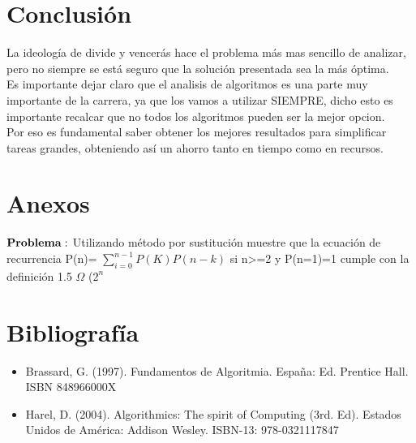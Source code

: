\documentclass[spanish]{article}
\begin{document}
	\section{Conclusi\'on}

	La ideología de divide y vencerás hace el problema más mas sencillo de analizar, pero no siempre se está seguro que la solución presentada sea la más óptima.\\
	Es importante dejar claro que el analisis de algoritmos es una parte muy importante de la carrera, ya que los vamos a utilizar SIEMPRE, dicho esto es importante recalcar que no todos los algoritmos pueden ser la mejor opcion.\\
	Por eso es fundamental saber obtener los mejores resultados para simplificar tareas grandes, obteniendo así un ahorro tanto en tiempo como en recursos.
		
\section{Anexos}
${\bf Problema :}$ Utilizando método por sustitución muestre que la ecuación de recurrencia P(n)= $\sum_{i=0}^{n-1}P(K)P(n-k)$ si n>=2 y P(n=1)=1 cumple con la definición 1.5 $\Omega$ ($2^{n}$ 

	\section{Bibliografía}
	\begin{itemize}
		\item Brassard, G. (1997). Fundamentos de Algoritmia. España: Ed. Prentice Hall. ISBN 		848966000X
		\item Harel, D. (2004). Algorithmics: The spirit of Computing (3rd. Ed). Estados Unidos de América: Addison
Wesley. ISBN-13: 978-0321117847
	\end{itemize}
	
\end{document}
